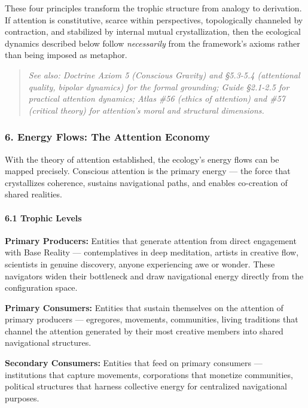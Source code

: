 These four principles transform the trophic structure from analogy to derivation. If attention is constitutive, scarce within perspectives, topologically channeled by contraction, and stabilized by internal mutual crystallization, then the ecological dynamics described below follow \textit{necessarily} from the framework's axioms rather than being imposed as metaphor.


\begin{quote}
\itshape
\textit{See also: Doctrine Axiom 5 (Conscious Gravity) and §5.3-5.4 (attentional quality, bipolar dynamics) for the formal grounding; Guide §2.1-2.5 for practical attention dynamics; Atlas \#56 (ethics of attention) and \#57 (critical theory) for attention's moral and structural dimensions.}
\end{quote}


\subsubsection*{6. Energy Flows: The Attention Economy}


With the theory of attention established, the ecology's energy flows can be mapped precisely. Conscious attention is the primary energy — the force that crystallizes coherence, sustains navigational paths, and enables co-creation of shared realities.


\paragraph*{6.1 Trophic Levels}


\textbf{Primary Producers:} Entities that generate attention from direct engagement with Base Reality — contemplatives in deep meditation, artists in creative flow, scientists in genuine discovery, anyone experiencing awe or wonder. These navigators widen their bottleneck and draw navigational energy directly from the configuration space.


\textbf{Primary Consumers:} Entities that sustain themselves on the attention of primary producers — egregores, movements, communities, living traditions that channel the attention generated by their most creative members into shared navigational structures.


\textbf{Secondary Consumers:} Entities that feed on primary consumers — institutions that capture movements, corporations that monetize communities, political structures that harness collective energy for centralized navigational purposes.


